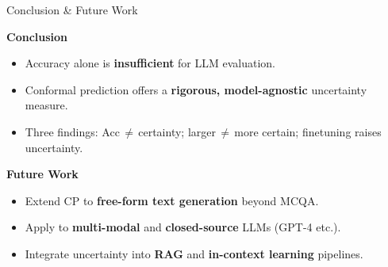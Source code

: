 \documentclass{beamer}
\begin{document}
\begin{frame}{Conclusion \& Future Work}

\begin{block}{\textbf{Conclusion}}
\begin{itemize}\setlength\itemsep{4pt}
  \item Accuracy alone is \textbf{insufficient} for LLM evaluation.
  \item Conformal prediction offers a \textbf{rigorous, model-agnostic} uncertainty measure.
  \item Three findings: Acc\,$\neq$\,certainty;\; larger\,$\neq$\,more certain;\;
        finetuning raises uncertainty.
\end{itemize}
\end{block}

\medskip

\begin{block}{\textbf{Future Work}}
\begin{itemize}\setlength\itemsep{4pt}
  \item Extend CP to \textbf{free-form text generation} beyond MCQA.
  \item Apply to \textbf{multi-modal} and \textbf{closed-source} LLMs (GPT-4 etc.).
  \item Integrate uncertainty into \textbf{RAG} and \textbf{in-context learning} pipelines.
\end{itemize}
\end{block}

\end{frame}
\end{document}
